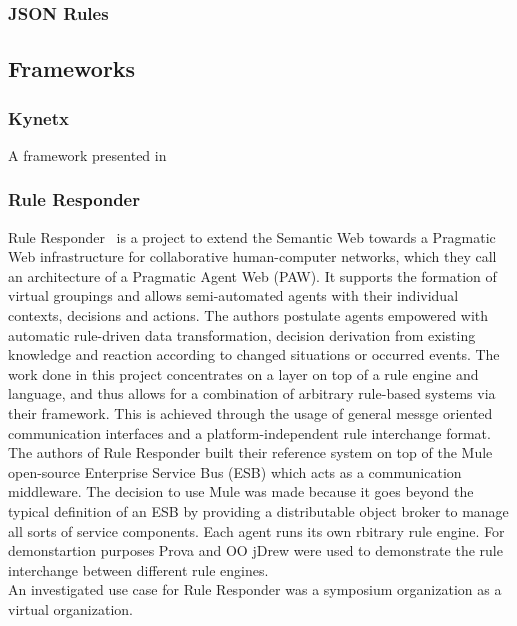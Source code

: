 \documentclass[11pt,twocolumn]{article}
\begin{document}
\subsubsection{JSON Rules}


\subsection{Frameworks}

\subsubsection{Kynetx}
A framework presented in ~\cite{bookTheLiveWeb}

\subsubsection{Rule Responder}
Rule Responder~\cite{2007-Paschke_etal-RuleResponder.pdf} is a project to extend the Semantic Web towards a Pragmatic Web infrastructure for collaborative human-computer networks, which they call an architecture of a Pragmatic Agent Web (PAW). It supports the formation of virtual groupings and allows semi-automated agents with their individual contexts, decisions and actions. The authors postulate agents empowered with automatic rule-driven data transformation, decision derivation from existing knowledge and reaction according to changed situations or occurred events. The work done in this project concentrates on a layer on top of a rule engine and language, and thus allows for a combination of arbitrary rule-based systems via their framework. This is achieved through the usage of general messge oriented communication interfaces and a platform-independent rule interchange format.
\\
The authors of Rule Responder built their reference system on top of the Mule~\cite{wwwmuleesb} open-source Enterprise Service Bus (ESB) which acts as a communication middleware. The decision to use Mule was made because it goes beyond the typical definition of an ESB by providing a distributable object broker to manage all sorts of service components. Each agent runs its own rbitrary rule engine. For demonstartion purposes Prova and OO jDrew were used to demonstrate the rule interchange between different rule engines.
\\
An investigated use case for Rule Responder was a symposium organization as a virtual organization.
\end{document}
